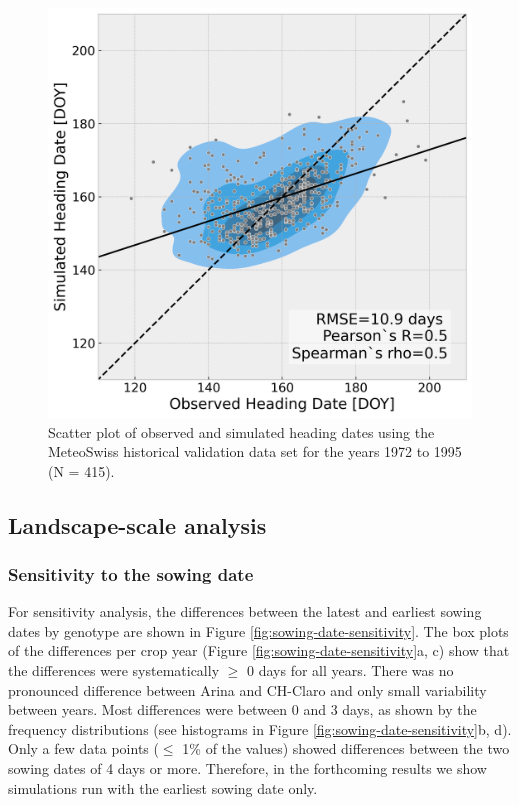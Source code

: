\begin{figure}[H]
    \centering
    \includegraphics[width=\textwidth]{03-Heading-Dates/img/scatter_plot_validation_meteoswiss.png}
    \caption{Scatter plot of observed and simulated heading dates using the MeteoSwiss historical validation data set for the years 1972 to 1995 (N = 415).}
    \label{fig:val-scatter-meteoswiss}
\end{figure}

\subsection{Landscape-scale analysis}

\subsubsection{Sensitivity to the sowing date}
\label{subsubsec:sensitivity}

For sensitivity analysis, the differences between the latest and earliest sowing dates by genotype are shown in Figure \ref{fig:sowing-date-sensitivity}. The box plots of the differences per crop year (Figure \ref{fig:sowing-date-sensitivity}a, c) show that the differences were systematically $\ge$ 0 days for all years. There was no pronounced difference between Arina and CH-Claro and only small variability between years. Most differences were between 0 and 3 days, as shown by the frequency distributions (see histograms in Figure \ref{fig:sowing-date-sensitivity}b, d). Only a few data points ($\le$ 1\% of the values) showed differences between the two sowing dates of 4 days or more. Therefore, in the forthcoming results we show simulations run with the earliest sowing date only.

